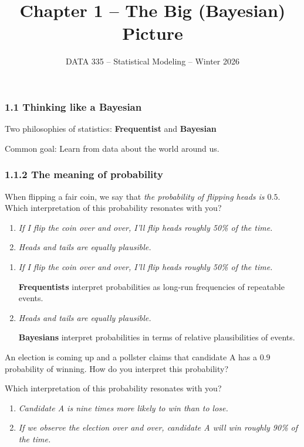 \documentclass{beamer}
\title{Chapter 1 -- The Big (Bayesian) Picture}
\date{DATA 335 -- Statistical Modeling -- Winter 2026}
\begin{document}
\frame{\titlepage}

\begin{frame}
    \setlength\parskip{1em}
    \frametitle{1.1 Thinking like a Bayesian}
    Two philosophies of statistics: \textbf{Frequentist} and \textbf{Bayesian}
    
    Common goal: Learn from data about the world around us.
\end{frame}

\begin{frame}
    \setlength\parskip{1em}
    \frametitle{1.1.2 The meaning of probability}

    When flipping a fair coin, we say that \textit{the probability of flipping heads is $0.5$}.
    Which interpretation of this probability resonates with you?

    \begin{enumerate}
        \setlength\itemsep{1em}
        \item \textit{If I flip the coin over and over, I'll flip heads roughly 50\% of the time.}
        \item \textit{Heads and tails are equally plausible.}
    \end{enumerate}
\end{frame}

\begin{frame}
    \begin{enumerate}
        \setlength\parskip{1em}
        \setlength\itemsep{1em}
        \item \textit{If I flip the coin over and over, I'll flip heads roughly 50\% of the time.}
        
        
        \textbf{Frequentists} interpret probabilities as long-run frequencies of repeatable events.

        \item \textit{Heads and tails are equally plausible.}
            
        \textbf{Bayesians} interpret probabilities in terms of relative plausibilities of events.
    \end{enumerate}
\end{frame}

\begin{frame}
    \setlength\parskip{1em}
    An election is coming up and a pollster claims that candidate A has a $0.9$
    probability of winning. How do you interpret this probability?

    Which interpretation of this probability resonates with you?

    \begin{enumerate}
        \setlength\itemsep{1em}
        \item \textit{Candidate A is nine times more likely to win than to lose.}
        \item \textit{If we observe the election over and over, candidate A will win roughly 90\% of the time.}
    \end{enumerate}
\end{frame}
\end{document}
